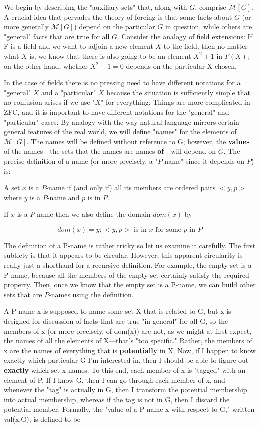 \documentclass[10pt]{article}
\theoremstyle{definition}
\begin{document}
We begin by describing the "auxiliary sets" that, along with $G$, comprise
$\mathcal M[G]$.  A crucial idea that pervades the theory of forcing is that some facts
about $G$ (or more generally $\mathcal{M}[G]$) depend on the particular $G$ in question,
while others are "general" facts that are true for all $G$.  Consider the
analogy of field extensions: If F is a field and we want to adjoin a new
element $X$ to the field, then no matter what $X$ is, we know that there is
also going to be an element $X^2 + 1$ in $F(X)$; on the other hand, whether
$X^2 + 1 = 0$ depends on the particular X chosen.

In the case of fields there is no pressing need to have different notations
for a "general" $X$ and a "particular" $X$ because the situation is sufficiently
simple that no confusion arises if we use "$X$" for everything.  Things are
more complicated in ZFC, and it is important to have different notations for
the "general" and "particular" cases.  By analogy with the way natural
language mirrors certain general features of the real world, we will define
"names" for the elements of $\mathcal{M}[G]$.  The names will be defined without
reference to G; however, the \textbf{values} of the names---the sets that the names
are names \textbf{of}---will depend on $G$.  The precise definition of a name (or
more precisely, a "$P$-name" since it depends on $P$) is:

  A set $x$ is a $P$-name if (and only if) all its members are
  ordered pairs $<y,p>$ where $y$ is a $P$-name and $p$ is in $P$.

If $x$ is a $P$-name then we also define the domain $dom(x)$ by

  $$dom(x) = {y : <y,p>\text{ is in }x\text{ for some }p\text{ in }P}$$

The definition of a P-name is rather tricky so let us examine it carefully.
The first subtlety is that it appears to be circular.  However, this
apparent circularity is really just a shorthand for a recursive definition.
For example, the empty set is a P-name, because all the members of the empty
set certainly satisfy the required property.  Then, once we know that the
empty set is a P-name, we can build other sets that are $P$-names using the
definition.

A P-name x is supposed to name some set X that is related to G, but x is
designed for discussion of facts that are true "in general" for all G, so
the members of x (or more precisely, of dom(x)) are not, as we might at
first expect, the names of all the elements of X---that's "too specific."
Rather, the members of x are the names of everything that is \textbf{potentially}
in X.  Now, if I happen to know exactly which particular G I'm interested
in, then I should be able to figure out \textbf{exactly} which set x names.  To
this end, each member of x is "tagged" with an element of P.  If I know G,
then I can go through each member of x, and whenever the "tag" is actually
in G, then I transform the potential membership into actual membership,
whereas if the tag is not in G, then I discard the potential member.
Formally, the "value of a P-name x with respect to G," written val(x,G), is
defined to be
\end{document}
